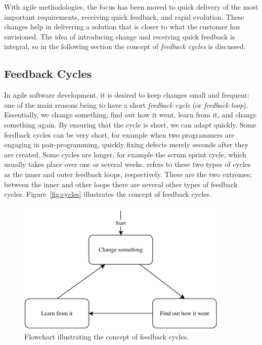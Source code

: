 \documentclass[a4paper,english,12pt]{report}
\begin{document}
With agile methodologies, the focus has been moved to quick delivery of the most important requirements, receiving quick feedback, and rapid evolution. These changes help in delivering a solution that is closer to what the customer has envisioned. The idea of introducing change and receiving quick feedback is integral, so in the following section the concept of \textit{feedback cycles} is discussed.

\subsection{Feedback Cycles}\label{sec:feedback-cycles-concept}
In agile software development, it is desired to keep changes small and frequent; one of the main reasons being to have a short \textit{feedback cycle} (or \textit{feedback loop}). Essentially, we change something, find out how it went, learn from it, and change something again. By ensuring that the cycle is short, we can adapt quickly. Some feedback cycles can be very short, for example when two programmers are engaging in pair-programming, quickly fixing defects merely seconds after they are created. Some cycles are longer, for example the scrum sprint cycle, which usually takes place over one or several weeks. \citet[pp. 18-19]{kniberg2010kanban} refers to these two types of cycles as the inner and outer feedback loops, respectively. These are the two extremes; between the inner and other loops there are several other types of feedback cycles. \citep[pp. 18-19]{kniberg2010kanban} Figure~\vref{fig:cycles} illustrates the concept of feedback cycles.

\begin{figure}[htbp]
  \centering
  \includegraphics[width=0.9\textwidth]{includes/figures/cycles}
  \caption{Flowchart illustrating the concept of feedback cycles.}
  \label{fig:cycles}
\end{figure}
\end{document}
